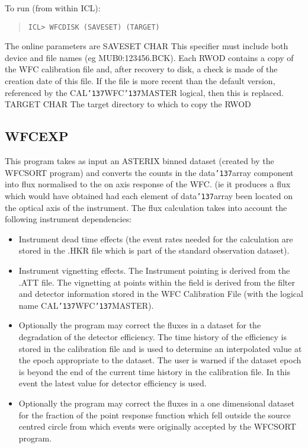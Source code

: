 \documentclass{book}
\renewcommand{\_}{{\tt\char'137}}     %
\begin{document}
To run (from within ICL):
\begin{quote}\begin{verbatim}
ICL> WFCDISK (SAVESET) (TARGET)
\end{verbatim}\end{quote}
The online parameters are
SAVESET CHAR This specifier must include both device and file
names (eg MUB0:123456.BCK). Each RWOD contains a
copy of the WFC calibration file and, after
recovery to disk, a check is made of the creation
date of this file. If the file is more recent than
the default version, referenced by the
CAL\_WFC\_MASTER logical, then this is replaced.
TARGET CHAR The target directory to which to copy the RWOD
\subsection{WFCEXP}
This program takes as input an ASTERIX binned dataset (created by the
WFCSORT program) and converts the counts in the data\_array component
into flux normalised to the on axis response of the WFC. (ie it
produces a flux which would have obtained had each element of
data\_array been located on the optical axis of the instrument. The flux
calculation takes into account the following instrument dependencies:
\begin{itemize}
\item Instrument dead time effects (the event rates needed for the
calculation are stored in the .HKR file which is part
of the standard observation dataset).
\item Instrument vignetting effects. The Instrument pointing is derived
from the .ATT file. The vignetting at points within the
field is derived from the filter and detector information stored
in the WFC Calibration File (with the logical name CAL\_WFC\_MASTER).
\item Optionally the program may correct the fluxes in a dataset for the
degradation of the detector efficiency. The time history of the
efficiency is stored in the calibration file and is used to
determine an interpolated value at the epoch appropriate to the
dataset. The user is warned if the dataset epoch is beyond the
end of the current time history in the calibration file. In this
event the latest value for detector efficiency is used.
\item Optionally the program may correct the fluxes in a one dimensional
dataset for the fraction of the point response function which fell
outside the source centred circle from which events were
originally accepted by the WFCSORT program.
\end{itemize}
\end{document}
